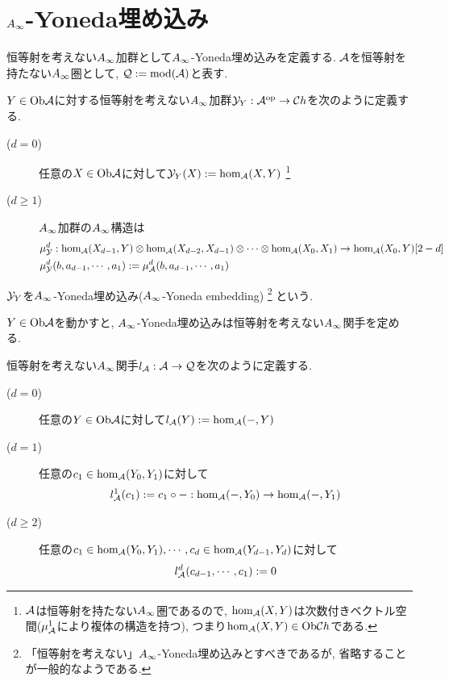 \documentclass[uplatex, a4paper, 14Q, dvipdfmx]{jsarticle}
\begin{document}
\section{\texorpdfstring{$A_{\infty}$}{Ainf}-Yoneda埋め込み}

恒等射を考えない$A_{\infty}$加群として$A_{\infty}$-Yoneda埋め込みを定義する. 
$\mathcal{A}$を恒等射を持たない$A_{\infty}$圏として, $\mathcal{Q} := \mathrm{mod} (\mathcal{A})$と表す. 

\begin{definition}
  $Y \in \mathrm{Ob}\mathcal{A}$に対する恒等射を考えない$A_{\infty}$加群$\mathcal{Y}_Y : \mathcal{A}^\mathrm{op} \to \mathcal{C} h$を次のように定義する. 
  \begin{description}
    \item[($d=0$)] 任意の$X \in \mathrm{Ob}\mathcal{A}$に対して$\mathcal{Y}_Y(X) := \hom_{\mathcal{A}}(X,Y)$
    \footnote{
      $\mathcal{A}$は恒等射を持たない$A_{\infty}$圏であるので, $\hom_{\mathcal{A}}(X,Y)$は次数付きベクトル空間($\mu^1_{\mathcal{A}}$により複体の構造を持つ), つまり$\hom_{\mathcal{A}}(X,Y) \in \mathrm{Ob}\mathcal{C} h$である. 
    }
    \item[($d \geq 1$)] $A_{\infty}$加群の$A_{\infty}$構造は
    \begin{align*}
      &\mu^d_{\mathcal{Y}} : \hom_{\mathcal{A}}(X_{d-1},Y) \otimes \hom_{\mathcal{A}}(X_{d-2},X_{d-1}) \otimes \cdots \otimes \hom_{\mathcal{A}}(X_0,X_1) \to \hom_{\mathcal{A}}(X_0,Y)[2-d] \\
      &\mu^d_{\mathcal{Y}}(b,a_{d-1},\cdots,a_1) := \mu^d_{\mathcal{A}}(b,a_{d-1},\cdots,a_1)
    \end{align*}
  \end{description}
  $\mathcal{Y}_Y$を$A_{\infty}$-Yoneda埋め込み($A_{\infty}$-Yoneda embedding)
  \footnote{
    「恒等射を考えない」$A_{\infty}$-Yoneda埋め込みとすべきであるが, 省略することが一般的なようである. 
  }
  という. 
\end{definition}

$Y \in \mathrm{Ob}\mathcal{A}$を動かすと, $A_{\infty}$-Yoneda埋め込みは恒等射を考えない$A_{\infty}$関手を定める. 

\begin{definition}
  恒等射を考えない$A_{\infty}$関手$l_{\mathcal{A}} : \mathcal{A} \to \mathcal{Q}$を次のように定義する. 
  \begin{description}
    \item[($d=0$)] 任意の$Y \in \mathrm{Ob}\mathcal{A}$に対して$l_{\mathcal{A}}(Y) := \hom_{\mathcal{A}}(-,Y)$
    \item[($d=1$)] 任意の$c_1 \in \hom_{\mathcal{A}}(Y_0,Y_1)$に対して 
    \begin{align*}
      l^1_{\mathcal{A}}(c_1) := c_1 \circ - : \hom_{\mathcal{A}}(-,Y_0) \to \hom_{\mathcal{A}}(-,Y_1)
    \end{align*}
    \item[($d \geq 2$)] 任意の$c_1 \in \hom_{\mathcal{A}}(Y_0,Y_1), \cdots, c_{d} \in \hom_{\mathcal{A}}(Y_{d-1},Y_{d})$に対して
    \begin{align*}
      l^d_{\mathcal{A}}(c_{d-1},\cdots,c_1) := 0
    \end{align*}
  \end{description}
\end{definition}
\end{document}
